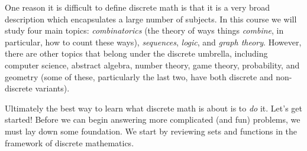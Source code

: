 \documentclass[12pt]{article}
\begin{document}
One reason it is difficult to define discrete math is that it is a very broad description which encapsulates a large number of subjects.  In this course we will study four main topics: {\em combinatorics} (the theory of ways things {\em combine}, in particular, how to count these ways), {\em sequences}, {\em logic}, and {\em graph theory}.  However, there are other topics that belong under the discrete umbrella, including computer science, abstract algebra, number theory, game theory, probability, and geometry (some of these, particularly the last two, have both discrete and non-discrete variants).  

Ultimately the best way to learn what discrete math is about is to {\em do} it.  Let's get started! Before we can begin answering more complicated (and fun) problems, we must lay down some foundation.  We start by reviewing sets and functions in the framework of discrete mathematics.


%
%
%


%
%
%
\end{document}
